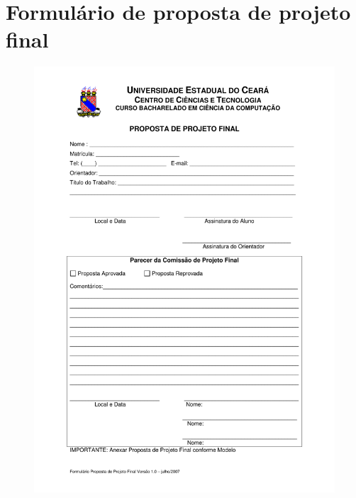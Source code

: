 \section{Formulário de proposta de projeto final}
\label{anx:proposta}
\begin{figure}[htbp]
\centering
\includegraphics[scale=0.6]{requisitos/Formulario_Proposta_Projeto_Final.pdf}
\end{figure}

\clearpage
